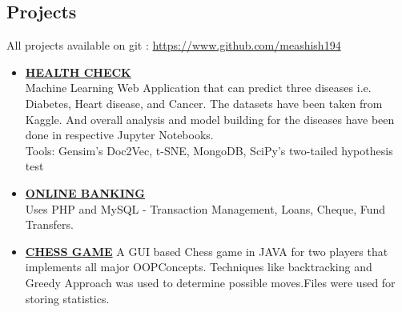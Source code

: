\documentclass[margin, centered]{res}
\begin{document}
\begin{resume}
\section{Projects}
All projects available on git : \url{https://www.github.com/meashish194}
\begin{itemize}[leftmargin=*]

 \item \textbf{\href{https://github.com/meashish194}{HEALTH CHECK}} \\
 Machine Learning Web Application that can predict three diseases i.e. Diabetes, Heart disease, and Cancer. The datasets have been taken from Kaggle. And overall analysis and model building for the diseases have been done in respective Jupyter Notebooks. \\
 Tools: Gensim’s Doc2Vec, t-SNE, MongoDB, SciPy’s two-tailed hypothesis test
 \item \textbf{\href{https://github.com/meashish194}{ONLINE BANKING}} \\
 Uses PHP and MySQL - Transaction Management, Loans, Cheque, Fund Transfers.
 \item \textbf{\href{https://github.com/meashish194}{CHESS GAME}} 
 A GUI based Chess game in JAVA for two players that implements all major OOPConcepts. Techniques like backtracking and Greedy Approach was used to determine possible moves.Files were used for storing statistics.
 
\end{itemize}





\end{resume}
\end{document}

